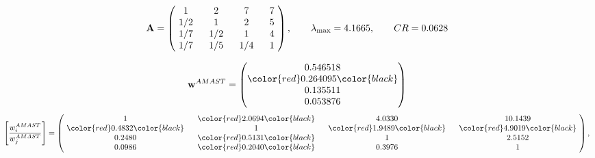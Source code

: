 \begin{example}
\begin{equation*}
\mathbf{A} =
\begin{pmatrix}
$\,\,$ 1 $\,\,$ & $\,\,$2$\,\,$ & $\,\,$7$\,\,$ & $\,\,$7 $\,\,$ \\
$\,\,$ 1/2$\,\,$ & $\,\,$ 1 $\,\,$ & $\,\,$2$\,\,$ & $\,\,$5 $\,\,$ \\
$\,\,$ 1/7$\,\,$ & $\,\,$ 1/2$\,\,$ & $\,\,$ 1 $\,\,$ & $\,\,$4 $\,\,$ \\
$\,\,$ 1/7$\,\,$ & $\,\,$ 1/5$\,\,$ & $\,\,$ 1/4$\,\,$ & $\,\,$ 1  $\,\,$ \\
\end{pmatrix},
\qquad
\lambda_{\max} =
4.1665,
\qquad
CR = 0.0628
\end{equation*}

\begin{equation*}
\mathbf{w}^{AMAST} =
\begin{pmatrix}
0.546518\\
\color{red} 0.264095\color{black} \\
0.135511\\
0.053876
\end{pmatrix}\end{equation*}
\begin{equation*}
\left[ \frac{{w}^{AMAST}_i}{{w}^{AMAST}_j} \right] =
\begin{pmatrix}
$\,\,$ 1 $\,\,$ & $\,\,$\color{red} 2.0694\color{black} $\,\,$ & $\,\,$4.0330$\,\,$ & $\,\,$10.1439$\,\,$ \\
$\,\,$\color{red} 0.4832\color{black} $\,\,$ & $\,\,$ 1 $\,\,$ & $\,\,$\color{red} 1.9489\color{black} $\,\,$ & $\,\,$\color{red} 4.9019\color{black}   $\,\,$ \\
$\,\,$0.2480$\,\,$ & $\,\,$\color{red} 0.5131\color{black} $\,\,$ & $\,\,$ 1 $\,\,$ & $\,\,$2.5152 $\,\,$ \\
$\,\,$0.0986$\,\,$ & $\,\,$\color{red} 0.2040\color{black} $\,\,$ & $\,\,$0.3976$\,\,$ & $\,\,$ 1  $\,\,$ \\
\end{pmatrix},
\end{equation*}


\end{example}
